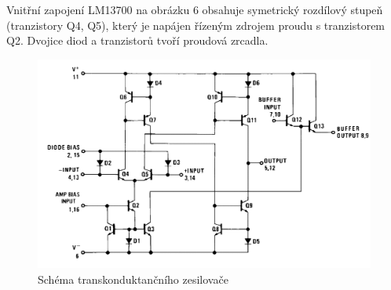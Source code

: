\documentclass[twoside]{article}
\begin{document}
\noindent Vnitřní zapojení LM13700 na obrázku 6 obsahuje symetrický rozdílový stupeň (tranzistory Q4, Q5), který je napájen řízeným zdrojem proudu s tranzistorem Q2. Dvojice diod a tranzistorů tvoří proudová zrcadla.
\begin{figure}[H]
\centering
\includegraphics[scale=0.25]{image5.png}
\caption{Schéma transkonduktančního zesilovače \cite{6}}
\end{figure}
\end{document}
